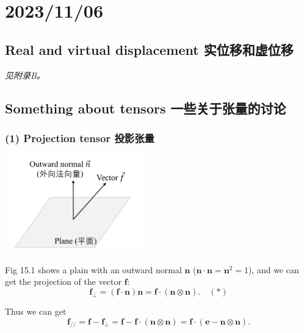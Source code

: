 \chapter{2023/11/06}\label{20231106}

\section{Real and virtual displacement
实位移和虚位移}\label{real-and-virtual-displacement-ux5b9eux4f4dux79fbux548cux865aux4f4dux79fb}

\emph{见附录B。}

\section{Something about tensors
一些关于张量的讨论}\label{something-about-tensors-ux4e00ux4e9bux5173ux4e8eux5f20ux91cfux7684ux8ba8ux8bba}

\subsection*{(1) Projection tensor
投影张量}\label{projection-tensor-ux6295ux5f71ux5f20ux91cf}

\begin{center}
    \includegraphics[height=120pt]{assets/Projection_Tensor.png}
\end{center}

Fig 15.1 shows a plain with an outward normal \(\boldsymbol n\)
(\(\boldsymbol n \cdot \boldsymbol n = \boldsymbol n^2 = 1\)), and we
can get the projection of the vector \(\boldsymbol f\):
\[\boldsymbol f_\perp = (\boldsymbol f \cdot \boldsymbol n) \boldsymbol n = \boldsymbol f \cdot (\boldsymbol n \otimes \boldsymbol n). \quad (*)\]

Thus we can get
\[\boldsymbol f_{/\!/} = \boldsymbol f - \boldsymbol f_\perp = \boldsymbol f - \boldsymbol f \cdot (\boldsymbol n \otimes \boldsymbol n) = \boldsymbol f \cdot (\mathbf e - \boldsymbol n \otimes \boldsymbol n).\]

